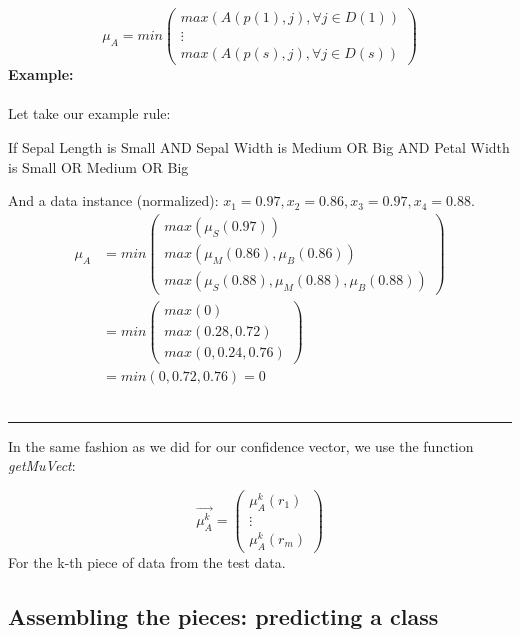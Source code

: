 \documentclass[a4paper,12pt]{article}
\begin{document}
\[\mu_A=
min
\begin{pmatrix}
max(A(p(1),j),\forall j \in D(1))\\
\vdots \\
max(A(p(s),j),\forall j \in D(s))
\end{pmatrix}
    \]
\textbf{Example:}\\
\\
Let take our example rule:
\begin{center}
If Sepal Length is Small AND Sepal Width is Medium OR Big AND Petal Width is Small OR Medium OR Big
\end{center}
And a data instance (normalized): $x_1=0.97,x_2=0.86,x_3=0.97,x_4=0.88$.\\
\[
\begin{split}
\mu_A &= min
\begin{pmatrix}
max(\mu_S(0.97))\\
max(\mu_M(0.86),\mu_B(0.86))\\
max(\mu_S(0.88),\mu_M(0.88),\mu_B(0.88))
\end{pmatrix}\\
&= min
\begin{pmatrix}
max(0)\\
max(0.28,0.72)\\
max(0,0.24,0.76)
\end{pmatrix}\\
&= min(0,0.72,0.76) = 0
\end{split}
\]
\\
\begin{center} \rule[1ex]{.5\textwidth}{.5pt} \end{center}
\newpage

In the same fashion as we did for our confidence vector, we use the function \textit{getMuVect}:

\[
\vec{\mu_A^k}=
\begin{pmatrix}
\mu_A^k(r_1)\\
\vdots\\
\mu_A^k(r_m)
\end{pmatrix}
\]
For the k-th piece of data from the test data.

\subsection{Assembling the pieces: predicting a class}
\end{document}
